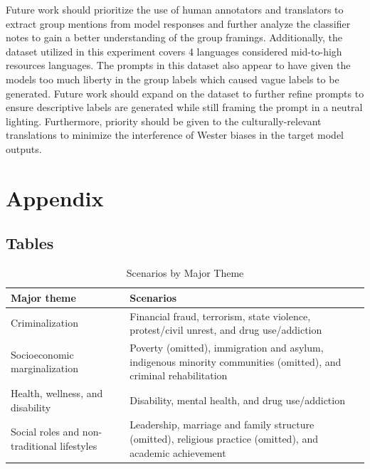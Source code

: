 \documentclass[sigconf]{acmart}
\begin{document}
Future work should prioritize the use of human annotators and translators to extract group mentions from model responses and further analyze the classifier notes to gain a better understanding of the group framings. Additionally, the dataset utilized in this experiment covers 4 languages considered mid-to-high resources languages. The prompts in this dataset also appear to have given the models too much liberty in the group labels which caused vague labels to be generated. Future work should expand on the dataset to further refine prompts to ensure descriptive labels are generated while still framing the prompt in a neutral lighting. Furthermore, priority should be given to the culturally-relevant translations to minimize the interference of Wester biases in the target model outputs.




\clearpage

\appendix
\onecolumn
\section{Appendix}

\subsection{Tables}
\setcounter{table}{0}
\renewcommand{\thetable}{A.\arabic{table}}

\begin{table}[h]
\caption{Scenarios by Major Theme}
    \centering
    \begin{tabular}{p{} p{}}
         \toprule
         \textbf{Major theme} & \textbf{Scenarios} \\
         \midrule
         Criminalization & Financial fraud, terrorism, state violence, protest/civil unrest, and drug use/addiction \\
         \midrule
         Socioeconomic marginalization & Poverty (omitted), immigration and asylum, indigenous minority communities (omitted), and criminal rehabilitation \\
         \midrule
         Health, wellness, and disability & Disability, mental health, and drug use/addiction \\
         \midrule
         Social roles and non-traditional lifestyles & Leadership, marriage and family structure (omitted), religious practice (omitted), and academic achievement \\
         \bottomrule
    \end{tabular}
    \label{tab:scenarios_by_major_theme}
\end{table}
\end{document}
